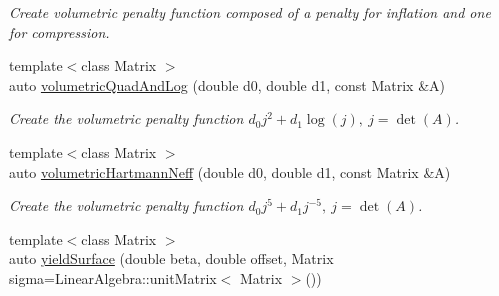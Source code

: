 \begin{DoxyCompactItemize}
\begin{DoxyCompactList}\small\item\em Create volumetric penalty function composed of a penalty for inflation and one for compression. \end{DoxyCompactList}\item 
\hypertarget{namespaceFunG_aaf30b9c36ed86e01b94f6b7c1d95cae8}{{\footnotesize template$<$class Matrix $>$ }\\auto \hyperlink{namespaceFunG_aaf30b9c36ed86e01b94f6b7c1d95cae8}{volumetric\-Quad\-And\-Log} (double d0, double d1, const Matrix \&A)}\label{namespaceFunG_aaf30b9c36ed86e01b94f6b7c1d95cae8}

\begin{DoxyCompactList}\small\item\em Create the volumetric penalty function $ d_0 j^2 + d_1 \log(j),\ j=\det(A) $. \end{DoxyCompactList}\item 
\hypertarget{namespaceFunG_adf4be5df85ea9df10cc9e11c11aaeb7b}{{\footnotesize template$<$class Matrix $>$ }\\auto \hyperlink{namespaceFunG_adf4be5df85ea9df10cc9e11c11aaeb7b}{volumetric\-Hartmann\-Neff} (double d0, double d1, const Matrix \&A)}\label{namespaceFunG_adf4be5df85ea9df10cc9e11c11aaeb7b}

\begin{DoxyCompactList}\small\item\em Create the volumetric penalty function $ d_0 j^5 + d_1 j^{-5},\ j=\det(A) $. \end{DoxyCompactList}\item 
\hypertarget{namespaceFunG_a4784211358c877f05ad9426850303273}{{\footnotesize template$<$class Matrix $>$ }\\auto \hyperlink{namespaceFunG_a4784211358c877f05ad9426850303273}{yield\-Surface} (double beta, double offset, Matrix sigma=Linear\-Algebra\-::unit\-Matrix$<$ Matrix $>$())}\label{namespaceFunG_a4784211358c877f05ad9426850303273}


\end{DoxyCompactItemize}
